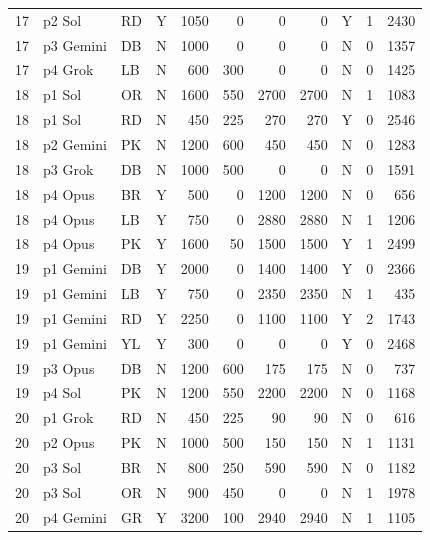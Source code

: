 \begin{longtable}{r l l l r r r r l r r}
17 & p2 Sol & RD & Y & 1050 & 0 & 0 & 0 & Y & 1 & 2430 \\
17 & p3 Gemini & DB & N & 1000 & 0 & 0 & 0 & N & 0 & 1357 \\
17 & p4 Grok & LB & N & 600 & 300 & 0 & 0 & N & 0 & 1425 \\
18 & p1 Sol & OR & N & 1600 & 550 & 2700 & 2700 & N & 1 & 1083 \\
18 & p1 Sol & RD & N & 450 & 225 & 270 & 270 & Y & 0 & 2546 \\
18 & p2 Gemini & PK & N & 1200 & 600 & 450 & 450 & N & 0 & 1283 \\
18 & p3 Grok & DB & N & 1000 & 500 & 0 & 0 & N & 0 & 1591 \\
18 & p4 Opus & BR & Y & 500 & 0 & 1200 & 1200 & N & 0 & 656 \\
18 & p4 Opus & LB & Y & 750 & 0 & 2880 & 2880 & N & 1 & 1206 \\
18 & p4 Opus & PK & Y & 1600 & 50 & 1500 & 1500 & Y & 1 & 2499 \\
19 & p1 Gemini & DB & Y & 2000 & 0 & 1400 & 1400 & Y & 0 & 2366 \\
19 & p1 Gemini & LB & Y & 750 & 0 & 2350 & 2350 & N & 1 & 435 \\
19 & p1 Gemini & RD & Y & 2250 & 0 & 1100 & 1100 & Y & 2 & 1743 \\
19 & p1 Gemini & YL & Y & 300 & 0 & 0 & 0 & Y & 0 & 2468 \\
19 & p3 Opus & DB & N & 1200 & 600 & 175 & 175 & N & 0 & 737 \\
19 & p4 Sol & PK & N & 1200 & 550 & 2200 & 2200 & N & 0 & 1168 \\
20 & p1 Grok & RD & N & 450 & 225 & 90 & 90 & N & 0 & 616 \\
20 & p2 Opus & PK & N & 1000 & 500 & 150 & 150 & N & 1 & 1131 \\
20 & p3 Sol & BR & N & 800 & 250 & 590 & 590 & N & 0 & 1182 \\
20 & p3 Sol & OR & N & 900 & 450 & 0 & 0 & N & 1 & 1978 \\
20 & p4 Gemini & GR & Y & 3200 & 100 & 2940 & 2940 & N & 1 & 1105 \\
\end{longtable}
\endgroup
{}
